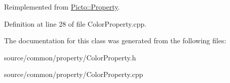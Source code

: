 Reimplemented from \hyperlink{class_picto_1_1_property_a97d52011d6db190c5c28a21d76ac1d3b}{Picto\-::\-Property}.



Definition at line 28 of file Color\-Property.\-cpp.



The documentation for this class was generated from the following files\-:\begin{DoxyCompactItemize}
\item 
source/common/property/Color\-Property.\-h\item 
source/common/property/Color\-Property.\-cpp\end{DoxyCompactItemize}
